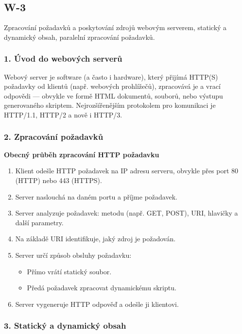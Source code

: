 \subsection{W-3}
Zpracování požadavků a poskytování zdrojů webovým serverem, statický a dynamický obsah, paralelní zpracování požadavků.

\subsubsection*{1. Úvod do webových serverů}

Webový server je software (a často i hardware), který přijímá HTTP(S) požadavky od klientů (např. webových prohlížečů), zpracovává je a vrací odpovědi — obvykle ve formě HTML dokumentů, souborů, nebo výstupu generovaného skriptem. Nejrozšířenějším protokolem pro komunikaci je HTTP/1.1, HTTP/2 a nově i HTTP/3.

\subsubsection*{2. Zpracování požadavků}

\textbf{Obecný průběh zpracování HTTP požadavku}

\begin{enumerate}
    \item Klient odešle HTTP požadavek na IP adresu serveru, obvykle přes port 80 (HTTP) nebo 443 (HTTPS).
    \item Server naslouchá na daném portu a příjme požadavek.
    \item Server analyzuje požadavek: metodu (např. GET, POST), URI, hlavičky a další parametry.
    \item Na základě URI identifikuje, jaký zdroj je požadován.
    \item Server určí způsob obsluhy požadavku:
    \begin{itemize}
        \item Přímo vrátí statický soubor.
        \item Předá požadavek zpracovat dynamickému skriptu.
    \end{itemize}
    \item Server vygeneruje HTTP odpověď a odešle ji klientovi.
\end{enumerate}

\subsubsection*{3. Statický a dynamický obsah}

